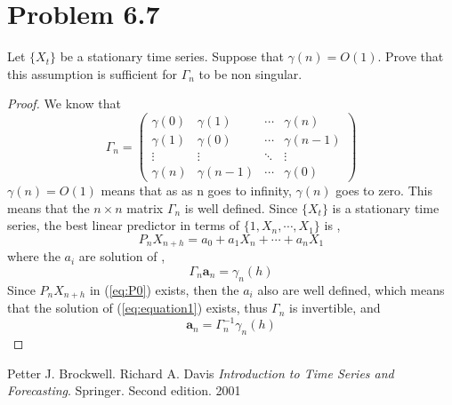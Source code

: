\documentclass[11pt, oneside]{article}   	%
\begin{document}
\section{Problem 6.7}
Let $\{X_{t}\}$ be a stationary time series. Suppose that $\gamma(n) =O(1)$. Prove that this assumption is sufficient for $\Gamma_{n}$ to be non singular.

\begin{proof}
We know that 
\begin{equation}
\Gamma_{n} = 
\begin{pmatrix}
  \gamma(0) & \gamma(1) & \cdots & \gamma(n) \\
  \gamma(1) & \gamma(0) & \cdots & \gamma(n-1) \\
  \vdots  & \vdots  & \ddots & \vdots  \\
  \gamma(n) & \gamma(n-1) & \cdots & \gamma(0) 
 \end{pmatrix}
\end{equation}
$\gamma(n) = O(1)$ means that as as n goes to infinity, $\gamma(n)$ goes to zero. This means that the $n\times n$ matrix $\Gamma_{n}$ is well defined. 
Since $\{X_{t}\}$ is a stationary time series, the best linear predictor in terms of $\{1, X_{n}, \cdots, X_{1}\}$ is \cite{petter},
\begin{equation}\label{eq:P0}
P_{n}X_{n+h} = a_{0} + a_{1}X_{n}+\cdots+a_{n}X_{1}
\end{equation}
where the $a_{i}$ are solution of \cite{petter},
\begin{equation}\label{eq:equation1}
\Gamma_{n}\textbf{a}_{n} = \gamma_{n}(h)
\end{equation}
Since $P_{n}X_{n+h}$ in (\ref{eq:P0}) exists, then the $a_{i}$ also are well defined, which means that the solution of (\ref{eq:equation1}) exists, thus $\Gamma_{n}$ is invertible, and
\begin{equation}\label{eq:equation2}
\textbf{a}_{n} = \Gamma_{n}^{-1}\gamma_{n}(h)
\end{equation}

\end{proof}
\begin{thebibliography}{9}
Petter J. Brockwell. Richard A. Davis
\textit{Introduction to Time Series and Forecasting}. 
Springer. Second edition. 2001
 
\end{thebibliography}
\end{document}
